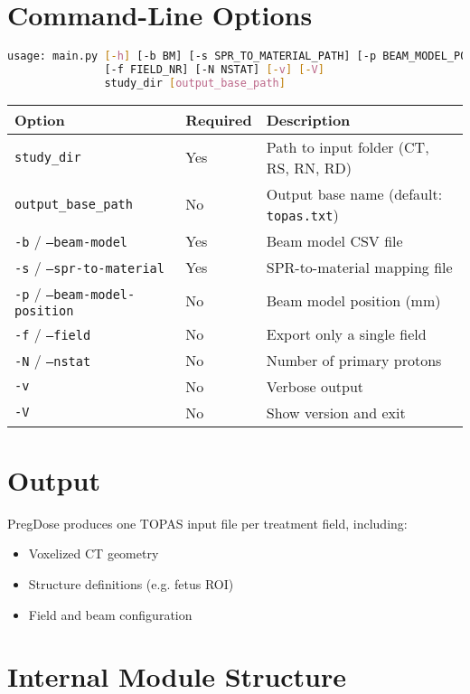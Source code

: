 \documentclass[11pt]{article}
\begin{document}
\section{Command-Line Options}

\begin{lstlisting}[language=bash]
usage: main.py [-h] [-b BM] [-s SPR_TO_MATERIAL_PATH] [-p BEAM_MODEL_POSITION]
               [-f FIELD_NR] [-N NSTAT] [-v] [-V]
               study_dir [output_base_path]
\end{lstlisting}

\begin{longtable}{|l|l|p{8cm}|}
\hline
\textbf{Option} & \textbf{Required} & \textbf{Description} \\
\hline
\texttt{study\_dir} & Yes & Path to input folder (CT, RS, RN, RD) \\
\texttt{output\_base\_path} & No & Output base name (default: \texttt{topas.txt}) \\
\texttt{-b} / \texttt{--beam-model} & Yes & Beam model CSV file \\
\texttt{-s} / \texttt{--spr-to-material} & Yes & SPR-to-material mapping file \\
\texttt{-p} / \texttt{--beam-model-position} & No & Beam model position (mm) \\
\texttt{-f} / \texttt{--field} & No & Export only a single field \\
\texttt{-N} / \texttt{--nstat} & No & Number of primary protons \\
\texttt{-v} & No & Verbose output \\
\texttt{-V} & No & Show version and exit \\
\hline
\end{longtable}

\section{Output}

PregDose produces one TOPAS input file per treatment field, including:
\begin{itemize}
    \item Voxelized CT geometry
    \item Structure definitions (e.g. fetus ROI)
    \item Field and beam configuration
\end{itemize}

\section{Internal Module Structure}
\end{document}
